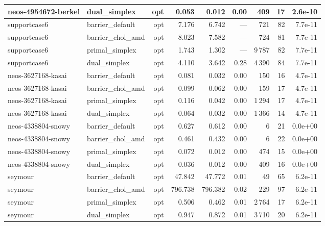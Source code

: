 \documentclass[11pt,a4paper]{article}
\begin{document}
\begin{table}[h]
\begin{tabular}{@{}llrrrrrrr@{}}
neos-4954672-berkel & dual\_simplex     & opt & 0.053 & 0.012 & 0.00 & 409     & 17  & 2.6e-10 \\
\midrule
supportcase6        & barrier\_default  & opt & 7.176 & 6.742 & ---  & 721     & 82  & 7.7e-11 \\
supportcase6        & barrier\_chol\_amd & opt & 8.023 & 7.582 & ---  & 724     & 81  & 7.7e-11 \\
supportcase6        & primal\_simplex   & opt & 1.743 & 1.302 & ---  & 9\,787  & 82  & 7.7e-11 \\
supportcase6        & dual\_simplex     & opt & 4.110 & 3.642 & 0.28 & 4\,390  & 84  & 7.7e-11 \\
\midrule
neos-3627168-kasai  & barrier\_default  & opt & 0.081 & 0.032 & 0.00 & 150     & 16  & 4.7e-11 \\
neos-3627168-kasai  & barrier\_chol\_amd & opt & 0.099 & 0.062 & 0.00 & 159     & 17  & 4.7e-11 \\
neos-3627168-kasai  & primal\_simplex   & opt & 0.116 & 0.042 & 0.00 & 1\,294  & 17  & 4.7e-11 \\
neos-3627168-kasai  & dual\_simplex     & opt & 0.064 & 0.032 & 0.00 & 1\,366  & 14  & 4.7e-11 \\
\midrule
neos-4338804-snowy  & barrier\_default  & opt & 0.627 & 0.612 & 0.00 & 6       & 21  & 0.0e+00 \\
neos-4338804-snowy  & barrier\_chol\_amd & opt & 0.461 & 0.432 & 0.00 & 6       & 22  & 0.0e+00 \\
neos-4338804-snowy  & primal\_simplex   & opt & 0.072 & 0.012 & 0.00 & 474     & 15  & 0.0e+00 \\
neos-4338804-snowy  & dual\_simplex     & opt & 0.036 & 0.012 & 0.00 & 409     & 16  & 0.0e+00 \\
\midrule
seymour             & barrier\_default  & opt & 47.842 & 47.772 & 0.01 & 49    & 65  & 6.2e-11 \\
seymour             & barrier\_chol\_amd & opt & 796.738 & 796.382 & 0.02 & 229 & 97  & 6.2e-11 \\
seymour             & primal\_simplex   & opt & 0.506 & 0.462 & 0.01 & 2\,764  & 17  & 6.2e-11 \\
seymour             & dual\_simplex     & opt & 0.947 & 0.872 & 0.01 & 3\,710  & 20  & 6.2e-11 \\
\bottomrule
\end{tabular}
\end{table}
\end{document}
